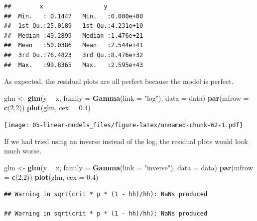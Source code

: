 \documentclass[openany]{book}
\newenvironment{Shaded}{\begin{snugshade}}{\end{snugshade}}
\newcommand{\DataTypeTok}[1]{\textcolor[rgb]{0.13,0.29,0.53}{#1}}
\newcommand{\DecValTok}[1]{\textcolor[rgb]{0.00,0.00,0.81}{#1}}
\newcommand{\FloatTok}[1]{\textcolor[rgb]{0.00,0.00,0.81}{#1}}
\newcommand{\KeywordTok}[1]{\textcolor[rgb]{0.13,0.29,0.53}{\textbf{#1}}}
\newcommand{\NormalTok}[1]{#1}
\newcommand{\OperatorTok}[1]{\textcolor[rgb]{0.81,0.36,0.00}{\textbf{#1}}}
\newcommand{\StringTok}[1]{\textcolor[rgb]{0.31,0.60,0.02}{#1}}
\begin{document}
\begin{verbatim}
##        x                 y            
##  Min.   : 0.1447   Min.   :0.000e+00  
##  1st Qu.:25.0189   1st Qu.:4.231e+10  
##  Median :49.2899   Median :1.476e+21  
##  Mean   :50.0386   Mean   :2.544e+41  
##  3rd Qu.:76.4823   3rd Qu.:8.476e+32  
##  Max.   :99.8365   Max.   :2.595e+43
\end{verbatim}

As expected, the residual plots are all perfect because the model is perfect.

\begin{Shaded}
\begin{Highlighting}[]
\NormalTok{glm <-}\StringTok{ }\KeywordTok{glm}\NormalTok{(y }\OperatorTok{~}\StringTok{ }\NormalTok{x, }\DataTypeTok{family =} \KeywordTok{Gamma}\NormalTok{(}\DataTypeTok{link =} \StringTok{"log"}\NormalTok{), }\DataTypeTok{data =}\NormalTok{ data)}
\KeywordTok{par}\NormalTok{(}\DataTypeTok{mfrow =} \KeywordTok{c}\NormalTok{(}\DecValTok{2}\NormalTok{,}\DecValTok{2}\NormalTok{))}
\KeywordTok{plot}\NormalTok{(glm, }\DataTypeTok{cex =} \FloatTok{0.4}\NormalTok{)}
\end{Highlighting}
\end{Shaded}

\texttt{[image: 05-linear-models\_files/figure-latex/unnamed-chunk-62-1.pdf]}

If we had tried using an inverse instead of the log, the residual plots would look much worse.

\begin{Shaded}
\begin{Highlighting}[]
\NormalTok{glm <-}\StringTok{ }\KeywordTok{glm}\NormalTok{(y }\OperatorTok{~}\StringTok{ }\NormalTok{x, }\DataTypeTok{family =} \KeywordTok{Gamma}\NormalTok{(}\DataTypeTok{link =} \StringTok{"inverse"}\NormalTok{), }\DataTypeTok{data =}\NormalTok{ data)}
\KeywordTok{par}\NormalTok{(}\DataTypeTok{mfrow =} \KeywordTok{c}\NormalTok{(}\DecValTok{2}\NormalTok{,}\DecValTok{2}\NormalTok{))}
\KeywordTok{plot}\NormalTok{(glm, }\DataTypeTok{cex =} \FloatTok{0.4}\NormalTok{)}
\end{Highlighting}
\end{Shaded}

\begin{verbatim}
## Warning in sqrt(crit * p * (1 - hh)/hh): NaNs produced

## Warning in sqrt(crit * p * (1 - hh)/hh): NaNs produced
\end{verbatim}
\end{document}
